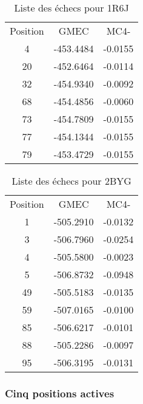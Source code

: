     \begin{table}[h]
      \centering

      \begin{tabular}{ccc}


        \toprule
        Position & GMEC & MC4- \\
        \cmidrule{1-3}
         4 & -453.4484 & -0.0155  \\
        20 & -452.6464 & -0.0114 \\
        32 & -454.9340 & -0.0092 \\
        68 & -454.4856 & -0.0060 \\
        73 & -454.7809 & -0.0155 \\
        77 & -454.1344 & -0.0155 \\
        79 & -453.4729 & -0.0155 \\
        \bottomrule
      \end{tabular}      
      \caption{Liste des échecs pour 1R6J }
\label{tab:result_1_active_1R6J}
    \end{table}

    \begin{table}[h]
      \centering

      \begin{tabular}{ccc}

        \toprule
        Position & GMEC & MC4- \\
        \cmidrule{1-3}
        1 & -505.2910 & -0.0132 \\
        3 & -506.7960 & -0.0254 \\
        4 & -505.5800 & -0.0023 \\
        5 & -506.8732 & -0.0948 \\
        49 & -505.5183 & -0.0135 \\
        59 & -507.0165 & -0.0100 \\
        85 & -506.6217 & -0.0101 \\
        88 & -505.2286 & -0.0097 \\
        95 & -506.3195 & -0.0131 \\
        \bottomrule
      \end{tabular}      
      \caption{Liste des échecs pour 2BYG }
\label{tab:result_1_active_2BYG}
    \end{table}


   \subsubsection{Cinq positions actives}


